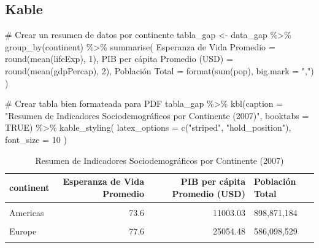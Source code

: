 \documentclass[
  10pt,
]{article}
\newenvironment{Shaded}{\begin{snugshade}}{\end{snugshade}}
\newcommand{\AttributeTok}[1]{\textcolor[rgb]{0.40,0.45,0.13}{#1}}
\newcommand{\CommentTok}[1]{\textcolor[rgb]{0.37,0.37,0.37}{#1}}
\newcommand{\ConstantTok}[1]{\textcolor[rgb]{0.56,0.35,0.01}{#1}}
\newcommand{\DecValTok}[1]{\textcolor[rgb]{0.68,0.00,0.00}{#1}}
\newcommand{\FunctionTok}[1]{\textcolor[rgb]{0.28,0.35,0.67}{#1}}
\newcommand{\NormalTok}[1]{\textcolor[rgb]{0.00,0.23,0.31}{#1}}
\newcommand{\OtherTok}[1]{\textcolor[rgb]{0.00,0.23,0.31}{#1}}
\newcommand{\SpecialCharTok}[1]{\textcolor[rgb]{0.37,0.37,0.37}{#1}}
\newcommand{\StringTok}[1]{\textcolor[rgb]{0.13,0.47,0.30}{#1}}
\begin{document}
\newpage

\subsection{Kable}\label{kable}

\begin{Shaded}
\begin{Highlighting}[]
\CommentTok{\# Crear un resumen de datos por continente}
\NormalTok{tabla\_gap }\OtherTok{\textless{}{-}}\NormalTok{ data\_gap }\SpecialCharTok{\%\textgreater{}\%}
  \FunctionTok{group\_by}\NormalTok{(continent) }\SpecialCharTok{\%\textgreater{}\%}
  \FunctionTok{summarise}\NormalTok{(}
    \StringTok{\textasciigrave{}}\AttributeTok{Esperanza de Vida Promedio}\StringTok{\textasciigrave{}} \OtherTok{=} \FunctionTok{round}\NormalTok{(}\FunctionTok{mean}\NormalTok{(lifeExp), }\DecValTok{1}\NormalTok{),}
    \StringTok{\textasciigrave{}}\AttributeTok{PIB per cápita Promedio (USD)}\StringTok{\textasciigrave{}} \OtherTok{=} \FunctionTok{round}\NormalTok{(}\FunctionTok{mean}\NormalTok{(gdpPercap), }\DecValTok{2}\NormalTok{),}
    \StringTok{\textasciigrave{}}\AttributeTok{Población Total}\StringTok{\textasciigrave{}} \OtherTok{=} \FunctionTok{format}\NormalTok{(}\FunctionTok{sum}\NormalTok{(pop), }\AttributeTok{big.mark =} \StringTok{","}\NormalTok{)}
\NormalTok{  )}

\CommentTok{\# Crear tabla bien formateada para PDF}
\NormalTok{tabla\_gap }\SpecialCharTok{\%\textgreater{}\%}
  \FunctionTok{kbl}\NormalTok{(}\AttributeTok{caption =} \StringTok{"Resumen de Indicadores Sociodemográficos por Continente (2007)"}\NormalTok{,}
    \AttributeTok{booktabs =} \ConstantTok{TRUE}\NormalTok{) }\SpecialCharTok{\%\textgreater{}\%}
  \FunctionTok{kable\_styling}\NormalTok{(}
    \AttributeTok{latex\_options =} \FunctionTok{c}\NormalTok{(}\StringTok{"striped"}\NormalTok{, }\StringTok{"hold\_position"}\NormalTok{),}
    \AttributeTok{font\_size =} \DecValTok{10}
\NormalTok{  )}
\end{Highlighting}
\end{Shaded}

\begin{table}[!h]
\centering
\caption{Resumen de Indicadores Sociodemográficos por Continente (2007)}
\centering
\fontsize{10}{12}\selectfont
\begin{tabular}[t]{lrrl}
\toprule
continent & Esperanza de Vida Promedio & PIB per cápita Promedio (USD) & Población Total\\
\midrule
\cellcolor{gray!10}{Africa} & \cellcolor{gray!10}{54.8} & \cellcolor{gray!10}{3089.03} & \cellcolor{gray!10}{929,539,692}\\
Americas & 73.6 & 11003.03 & 898,871,184\\
\cellcolor{gray!10}{Asia} & \cellcolor{gray!10}{70.7} & \cellcolor{gray!10}{12473.03} & \cellcolor{gray!10}{3,811,953,827}\\
Europe & 77.6 & 25054.48 & 586,098,529\\
\cellcolor{gray!10}{Oceania} & \cellcolor{gray!10}{80.7} & \cellcolor{gray!10}{29810.19} & \cellcolor{gray!10}{24,549,947}\\
\bottomrule
\end{tabular}
\end{table}
\end{document}
